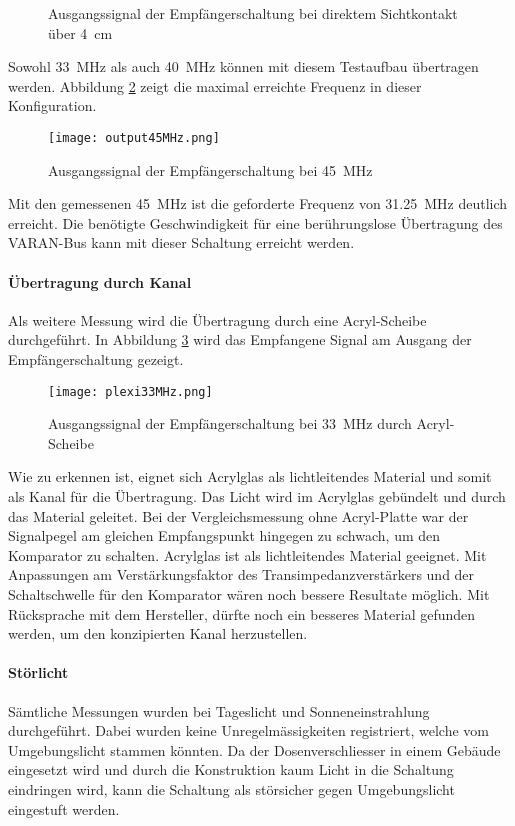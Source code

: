 \begin{figure}[h!]
	\centering
	\qquad
	\caption{Ausgangssignal der Empfängerschaltung bei direktem Sichtkontakt über \SI{4}{cm}}
	\label{fig:output33_40}
\end{figure}

Sowohl \SI{33}{MHz} als auch \SI{40}{MHz} können mit diesem Testaufbau übertragen werden. Abbildung \ref{fig:output45} zeigt die maximal erreichte Frequenz in dieser Konfiguration.


\begin{figure}[h!]
	\centering
	\texttt{[image: output45MHz.png]}
	\caption{Ausgangssignal der Empfängerschaltung bei \SI{45}{MHz}}
	\label{fig:output45}
\end{figure}

Mit den gemessenen \SI{45}{MHz} ist die geforderte Frequenz von \SI{31.25}{MHz} deutlich erreicht. Die benötigte Geschwindigkeit für eine berührungslose Übertragung des VARAN-Bus kann mit dieser Schaltung erreicht werden.

\newpage
\paragraph{Übertragung durch Kanal}
Als weitere Messung wird die Übertragung durch eine Acryl-Scheibe durchgeführt. In Abbildung \ref{fig:plexi33} wird das Empfangene Signal am Ausgang der Empfängerschaltung gezeigt.
\begin{figure}[h!]
	\centering
	\texttt{[image: plexi33MHz.png]}
	\caption{Ausgangssignal der Empfängerschaltung bei \SI{33}{MHz} durch Acryl-Scheibe}\label{fig:plexi33}
\end{figure}
Wie zu erkennen ist, eignet sich Acrylglas als lichtleitendes Material und somit als Kanal für die Übertragung. Das Licht wird im Acrylglas gebündelt und durch das Material geleitet. Bei der Vergleichsmessung ohne Acryl-Platte war der Signalpegel am gleichen Empfangspunkt hingegen zu schwach, um den Komparator zu schalten. Acrylglas ist als lichtleitendes Material geeignet. Mit Anpassungen am Verstärkungsfaktor des Transimpedanzverstärkers und der Schaltschwelle für den Komparator wären noch bessere Resultate möglich. Mit Rücksprache mit dem Hersteller, dürfte noch ein besseres Material gefunden werden, um den konzipierten Kanal herzustellen.

\paragraph{Störlicht}
Sämtliche Messungen wurden bei Tageslicht und Sonneneinstrahlung durchgeführt. Dabei wurden keine Unregelmässigkeiten registriert, welche vom Umgebungslicht stammen könnten. Da der Dosenverschliesser in einem Gebäude eingesetzt wird und durch die Konstruktion kaum Licht in die Schaltung eindringen wird, kann die Schaltung als störsicher gegen Umgebungslicht eingestuft werden.